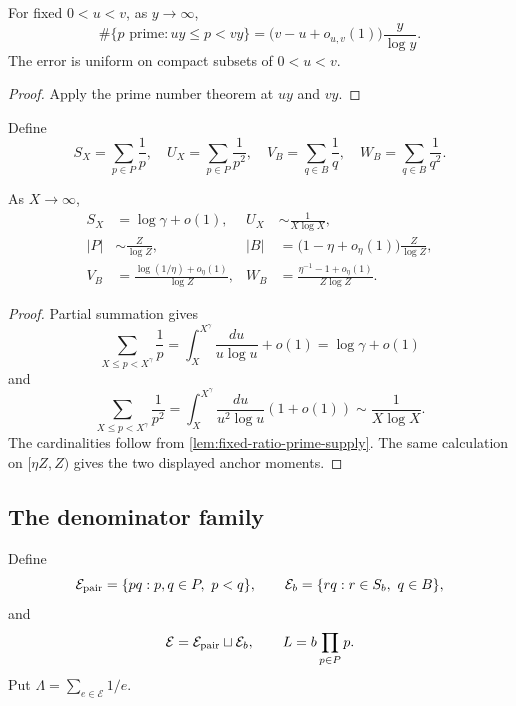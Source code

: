 \begin{lemma}
\label{lem:fixed-ratio-prime-supply}
For fixed $0<u<v$, as $y\to\infty$,
\[
 \#\{p\text{ prime}:uy\leq p<vy\}
 =\bigl(v-u+o_{u,v}(1)\bigr)\frac{y}{\log y}.
\]
The error is uniform on compact subsets of $0<u<v$.
\end{lemma}
\begin{proof}
Apply the prime number theorem at $uy$ and $vy$.
\end{proof}

Define
\[
 S_X=\sum_{p\in P}\frac1p,
 \quad U_X=\sum_{p\in P}\frac1{p^2},
 \quad V_B=\sum_{q\in B}\frac1q,
 \quad W_B=\sum_{q\in B}\frac1{q^2}.
\]

\begin{lemma}
\label{lem:reciprocal-prime-estimates}
As $X\to\infty$,
\begin{align}
 S_X&=\log\gamma+o(1), & U_X&\sim\frac1{X\log X},\label{eq:prime-moments}\\
 |P|&\sim\frac{Z}{\log Z}, & |B|&=\bigl(1-\eta+o_\eta(1)\bigr)\frac{Z}{\log Z},\label{eq:B-cardinality}\\
 V_B&=\frac{\log(1/\eta)+o_\eta(1)}{\log Z}, &
 W_B&=\frac{\eta^{-1}-1+o_\eta(1)}{Z\log Z}.
 \label{eq:B-power-sums}
\end{align}
\end{lemma}
\begin{proof}
Partial summation gives
\[
 \sum_{X\leq p<X^\gamma}\frac1p
 =\int_X^{X^\gamma}\frac{du}{u\log u}+o(1)=\log\gamma+o(1)
\]
and
\[
 \sum_{X\leq p<X^\gamma}\frac1{p^2}
 =\int_X^{X^\gamma}\frac{du}{u^2\log u}(1+o(1))\sim\frac1{X\log X}.
\]
The cardinalities follow from \cref{lem:fixed-ratio-prime-supply}. The same calculation on $[\eta Z,Z)$ gives the two displayed anchor moments.
\end{proof}

\subsection{The denominator family}

Define
\[
 \mathcal E_{\rm pair}=\{pq:p,q\in P,\ p<q\},
 \qquad
 \mathcal E_b=\{rq:r\in S_b,\ q\in B\},
\]
and
\begin{equation}
\label{eq:E-and-L}
 \mathcal E=\mathcal E_{\rm pair}\sqcup\mathcal E_b,
 \qquad L=b\prod_{p\in P}p.
\end{equation}
Put $\Lambda=\sum_{e\in\mathcal E}1/e$.

